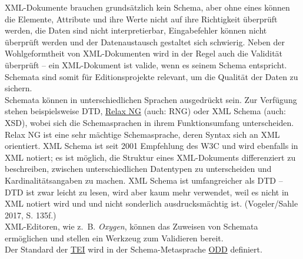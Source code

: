\documentclass{article}
\begin{document}
        XML-Dokumente brauchen grundsätzlich kein Schema, aber ohne eines können die Elemente, Attribute und ihre Werte nicht auf ihre Richtigkeit überprüft werden, die Daten sind nicht interpretierbar, Eingabefehler können nicht überprüft werden und der Datenaustausch gestaltet sich schwierig. Neben der Wohlgeformtheit von XML-Dokumenten wird in der Regel auch die Validität überprüft – ein XML-Dokument ist valide, wenn es seinem Schema entspricht. Schemata sind somit für Editionsprojekte relevant, um die Qualität der Daten zu sichern. \\
            
        Schemata können in unterschiedlichen Sprachen ausgedrückt sein. Zur Verfügung stehen beispielsweise DTD, \href{http://gams.uni-graz.at/o:konde.163}{Relax NG} (auch: RNG) oder XML Schema (auch: XSD), wobei sich die Schemasprachen in ihrem Funktionsumfang unterscheiden. Relax NG ist eine sehr mächtige Schemasprache, deren Syntax sich an XML orientiert. XML Schema ist seit 2001 Empfehlung des W3C und wird ebenfalls in XML notiert; es ist möglich, die Struktur eines XML-Dokuments differenziert zu beschreiben, zwischen unterschiedlichen Datentypen zu unterscheiden und Kardinalitätsangaben zu machen. XML Schema ist umfangreicher als DTD – DTD ist zwar leicht zu lesen, wird aber kaum mehr verwendet, weil es nicht in XML notiert wird und und nicht sonderlich ausdrucksmächtig ist. (Vogeler/Sahle 2017, S. 135f.)\\
            
        XML-Editoren, wie z. B. \emph{Oxygen}, können das Zuweisen von Schemata ermöglichen und stellen ein Werkzeug zum Validieren bereit.\\
            
        Der Standard der \href{http://gams.uni-graz.at/o:konde.178}{TEI} wird in der Schema-Metasprache \href{http://gams.uni-graz.at/o:konde.150}{ODD} definiert.\\
            
\end{document}
